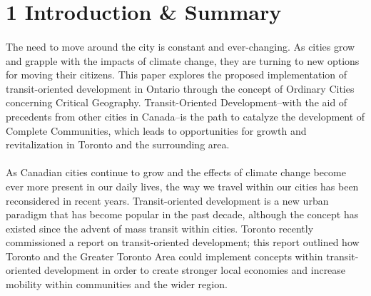 \documentclass[12pt]{book}
\title{\coursetitle\linebreak\lecturename}
\author{\\Cain Susko\\ 
           \\ \\ \\
      Queen's University 
    \\School of Computing\\}
\begin{document}
\begin{titlepage}
        \maketitle
\end{titlepage}


\section*{1 Introduction \& Summary} %
\paragraph*{}
The need to move around the city is constant and ever-changing. As cities grow and grapple with the impacts of climate change, they are turning 
to new options for moving their citizens. This paper explores the proposed implementation of transit-oriented development in Ontario through the 
concept of Ordinary Cities concerning Critical Geography. Transit-Oriented Development–with the aid of precedents from other cities in Canada–is 
the path to catalyze the development of Complete Communities, which leads to opportunities for growth and revitalization in Toronto and the surrounding 
area.

\paragraph*{}
As Canadian cities continue to grow and the effects of climate change become ever more present in our daily lives, the way we travel within our cities 
has been reconsidered in recent years. Transit-oriented development is a new urban paradigm that has become popular in the past decade, although the 
concept has existed since the advent of mass transit within cities. Toronto recently commissioned a report on transit-oriented development; this report 
outlined how Toronto and the Greater Toronto Area could implement concepts within transit-oriented development in order to create stronger local 
economies and increase mobility within communities and the wider region.\cite{report} 
\end{document}
